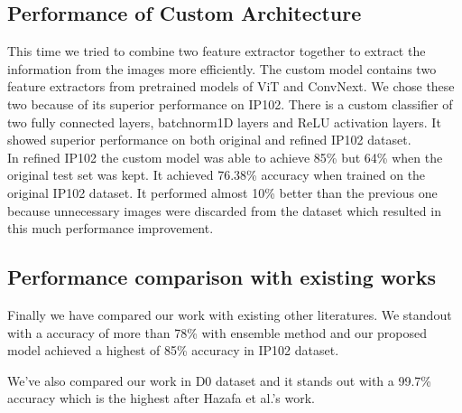 \subsection{Performance of Custom Architecture}

This time we tried to combine two feature extractor together to extract the information from the images more efficiently. The custom model contains two feature extractors from pretrained models of ViT and ConvNext. We chose these two because of its superior performance on IP102. There is a custom classifier of two fully connected layers, batchnorm1D layers and ReLU activation layers. It showed superior performance on both original and refined IP102 dataset.\\
In refined IP102 the custom model was able to achieve 85\% but 64\% when the original test set was kept. It achieved 76.38\% accuracy when trained on the original IP102 dataset. It performed almost 10\% better than the previous one because unnecessary images were discarded from the dataset which resulted in this much performance improvement.

\subsection{Performance comparison with existing works}
Finally we have compared our work with existing other literatures. We standout with a accuracy of more than 78\% with ensemble method and our proposed model achieved a highest of 85\% accuracy in IP102 dataset.

We've also compared our work in D0 dataset and it stands out with a 99.7\% accuracy which is the highest after Hazafa et al.'s \cite{hazafa2022evaluation} work.